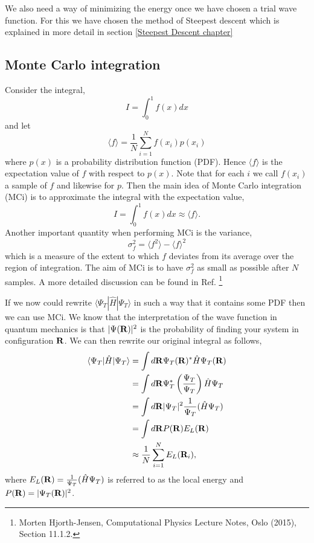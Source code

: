 \documentclass[a4paper,10pt]{article}
\begin{document}
We also need a way of minimizing the energy once we have chosen a trial wave function. For this we have
chosen the method of Steepest descent which is explained in more detail in section \ref{Steepest Descent chapter}

\subsection{Monte Carlo integration}
Consider the integral,
\begin{equation}
 I = \int_{0}^1 f(x) dx
\end{equation}
and let
\begin{equation}
 \langle f \rangle = \frac{1}{N} \sum_{i=1}^N f(x_i)p(x_i)
\end{equation}
where $p(x)$ is a probability distribution function (PDF). Hence $\langle f \rangle$ is the expectation value of $f$ with respect 
to $p(x)$. Note that for each $i$ we call $f(x_i)$ a sample of $f$ and likewise for $p$. Then the main idea of Monte Carlo integration (MCi) is to approximate the integral with the expectation value,
\begin{equation}
 I = \int_{0}^1 f(x) dx \approx \langle f \rangle.
\end{equation}
Another important quantity when performing MCi is the variance,
\begin{equation}
 \sigma_f^2 = \langle f^2 \rangle - \langle f \rangle^2
\end{equation}
which is a measure of the extent to which $f$ deviates from its average over the region of integration. The aim of MCi is to have 
$\sigma_f^2$ as small as possible after $N$ samples. A more detailed discussion can be found in Ref. \footnote{Morten Hjorth-Jensen, Computational Physics Lecture Notes, Oslo (2015), Section 11.1.2.}

If we now could rewrite $\langle \Psi_T | \hat{H} | \Psi_T \rangle$ in such a way that it contains some PDF then we can use MCi. We know that 
the interpretation of the wave function in quantum mechanics is that $|\Psi({\bf R})|^2$ is the probability of finding your system in configuration ${\bf R}$. We can then
rewrite our original integral as follows,
\begin{align*}
 \langle \Psi_T | \hat{H} | \Psi_T \rangle &= \int d{\bf R} \Psi_T({\bf R})^* \hat{H} \Psi_T({\bf R}) \\
				   &= \int d{\bf R} \Psi_T^* \left(\frac{\Psi_T}{\Psi_T}\right) \hat{H} \Psi_T \\
				   &= \int d{\bf R} |\Psi_T|^2 \frac{1}{\Psi_T}(\hat{H}\Psi_T) \\
				   &= \int d{\bf R} P({\bf R}) E_L({\bf R}) \\
				   &\approx \frac{1}{N} \sum_{i=1}^N E_L({\bf R}_i),
\end{align*}
where $E_L({\bf R}) = \frac{1}{\Psi_T}(\hat{H}\Psi_T) $ is referred to as the local energy and $P({\bf R}) = |\Psi_T({\bf R})|^2$.
\end{document}
